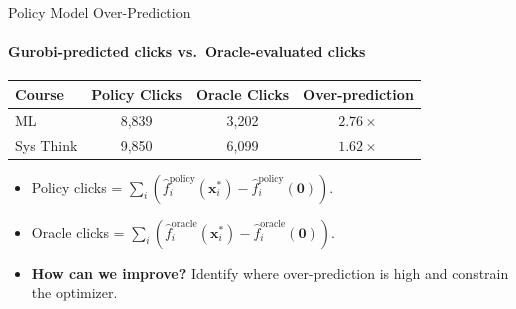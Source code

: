 \documentclass[smaller]{beamer}
\begin{document}
\begin{frame}{Policy Model Over-Prediction}
\framesubtitle{Gurobi-predicted clicks vs.\ Oracle-evaluated clicks}

\begin{table}[htbp]
\centering
\begin{tabular}{lccc}
\toprule
Course & Policy Clicks & Oracle Clicks & Over-prediction \\
\midrule
ML        & 8,839 & 3,202 & $2.76\times$ \\
Sys Think & 9,850 & 6,099 & $1.62\times$ \\
\bottomrule
\end{tabular}
\end{table}

\medskip
\begin{itemize}
    \item Policy clicks = $\sum_i (\hat{f}_i^{\text{policy}}(\mathbf{x}_i^*) - \hat{f}_i^{\text{policy}}(\mathbf{0}))$.
    \item Oracle clicks = $\sum_i (\hat{f}_i^{\text{oracle}}(\mathbf{x}_i^*) - \hat{f}_i^{\text{oracle}}(\mathbf{0}))$.
    \item \textbf{How can we improve?} Identify where over-prediction is high and constrain the optimizer.
\end{itemize}

\end{frame}
\end{document}
